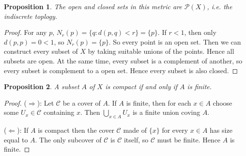 \documentclass[12pt]{article}
\newtheorem*{prop}{Proposition}
\theoremstyle{remark}
\theoremstyle{named}
\renewcommand{\implies}{\Rightarrow}
\newcommand{\coimplies}{\Leftarrow}
\begin{document}
\begin{prop}
    The open and closed sets in this metric are $\mathcal P (X)$, i.e. the indiscrete toplogy.   
\end{prop}

\begin{proof}
    For any $p$, $N_r(p) = \{q : d(p, q) < r\} = \{p\}$. If $r < 1$, then only $d(p, p) = 0 < 1$, so $N_r(p) = \{p\}$. So every point is an open set. Then we can construct every subset of $X$ by taking suitable unions of the points. Hence all subsets are open. At the same time, every subset is a complement of another, so every subset is complement to a open set. Hence every subset is also closed. 
\end{proof}

\begin{prop}
    A subset $A$ of $X$ is compact if and only if $A$ is finite.
\end{prop}

\begin{proof}
    ($\implies$): Let $\mathcal C$ be a cover of $A$. If $A$ is finite, then for each $x \in A$ choose some $U_x \in \mathcal C$ containing $x$. Then $\bigcup_{x \in A} U_x$ is a finite union coving $A$.

    ($\coimplies$): If $A$ is compact then the cover $\mathcal C$ made of $\{x\}$ for every $x \in A$ has size equal to $A$. The only subcover of $\mathcal C$ is $\mathcal C$ itself, so $\mathcal C$ must be finite. Hence $A$ is finite.
\end{proof}
\end{document}
